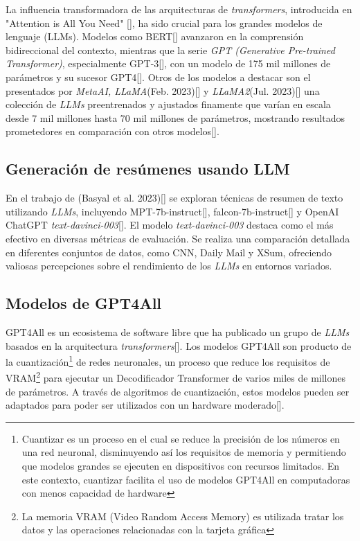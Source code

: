     La influencia transformadora de las arquitecturas de \emph{transformers}, introducida en "Attention is All You Need" [\cite{attention}], ha sido crucial para los grandes modelos de lenguaje (LLMs). Modelos como BERT[\cite{BERT}] avanzaron en la comprensión bidireccional del contexto, mientras que la serie \emph{GPT (Generative Pre-trained Transformer)}, especialmente GPT-3[\cite{brown2020language}], con un modelo de 175 mil millones de parámetros y su sucesor GPT4[\cite{openai2023gpt4}]. Otros de los modelos a destacar son el presentados por \emph{MetaAI, LLaMA}(Feb. 2023)[\cite{llamapaper}] y \emph{LLaMA2}(Jul. 2023)[\cite{llamapaper2}] una colección de \emph{LLMs} preentrenados y ajustados finamente que varían en escala desde 7 mil millones hasta 70 mil millones de parámetros, mostrando resultados prometedores en comparación con otros modelos[\cite{metallama}]. 
    
    \subsection{Generación de resúmenes usando LLM}

    En el trabajo de (Basyal et al. 2023)[\cite{basyal2023text}] se exploran técnicas de resumen de texto utilizando \emph{LLMs}, incluyendo MPT-7b-instruct[\cite{mpt}], falcon-7b-instruct[\cite{falcon}] y OpenAI ChatGPT \emph{text-davinci-003}[\cite{brown2020language}]. El modelo \emph{text-davinci-003} destaca como el más efectivo en diversas métricas de evaluación. Se realiza una comparación detallada en diferentes conjuntos de datos, como CNN, Daily Mail y XSum, ofreciendo valiosas percepciones sobre el rendimiento de los \emph{LLMs} en entornos variados. 

    \subsection{Modelos de GPT4All}

        GPT4All es un ecosistema de software libre que ha publicado un grupo de \emph{LLMs} basados en la arquitectura \emph{transformers}[\cite{attention}]. Los modelos GPT4All son producto de la cuantización\footnote{Cuantizar es un proceso en el cual se reduce la precisión de los números en una red neuronal, disminuyendo así los requisitos de memoria y permitiendo que modelos grandes se ejecuten en dispositivos con recursos limitados. En este contexto, cuantizar facilita el uso de modelos GPT4All en computadoras con menos capacidad de hardware} de redes neuronales, un proceso que reduce los requisitos de VRAM\footnote{La memoria VRAM (Video Random Access Memory) es utilizada tratar los datos y las operaciones relacionadas con la tarjeta gráfica} para ejecutar un Decodificador Transformer de varios miles de millones de parámetros. A través de algoritmos de cuantización, estos modelos pueden ser adaptados para poder ser utilizados con un hardware moderado[\cite{webgpt4all}].
        
